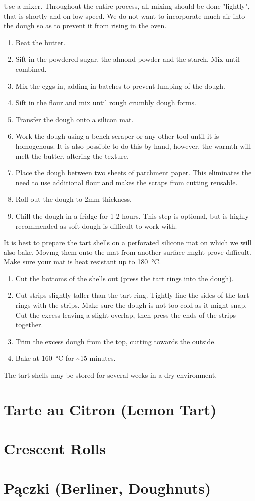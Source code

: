 Use a mixer. Throughout the entire process, all mixing should be done "lightly",
that is shortly and on low speed. We do not want to incorporate much air into
the dough so as to prevent it from rising in the oven.
\begin{enumerate}
  \item Beat the butter.
  \item Sift in the powdered sugar, the almond powder and the starch. Mix until
  combined.
  \item Mix the eggs in, adding in batches to prevent lumping of the dough.
  \item Sift in the flour and mix until rough crumbly dough forms.
  \item Transfer the dough onto a silicon mat.
  \item Work the dough using a bench scraper or any other tool until it is
  homogenous. It is also possible to do this by hand, however, the warmth will
  melt the butter, altering the texture.
  \item Place the dough between two sheets of parchment paper. This eliminates
  the need to use additional flour and makes the scraps from cutting reusable.
  \item Roll out the dough to 2mm thickness.
  \item Chill the dough in a fridge for 1-2 hours. This step is optional, but
  is highly recommended as soft dough is difficult to work with.
  \saveenum
\end{enumerate}
It is best to prepare the tart shells on a perforated silicone mat on which we
will also bake. Moving them onto the mat from another surface might prove
difficult. Make sure your mat is heat resistant up to \SI{180}{\celsius}.
\begin{enumerate}
  \contenum
  \item Cut the bottoms of the shells out (press the tart rings into the dough).
  \item Cut strips slightly taller than the tart ring. Tightly line the sides
  of the tart rings with the strips. Make sure the dough is not too cold as it
  might snap. Cut the excess leaving a slight overlap, then press the ends of
  the strips together.
  \item Trim the excess dough from the top, cutting towards the outside.
  \item Bake at \SI{160}{\celsius} for \textasciitilde 15 minutes.
\end{enumerate}
The tart shells may be stored for several weeks in a dry environment.

\section{Tarte au Citron (Lemon Tart)}


\section{Crescent Rolls}

\section{Pączki (Berliner, Doughnuts)}
